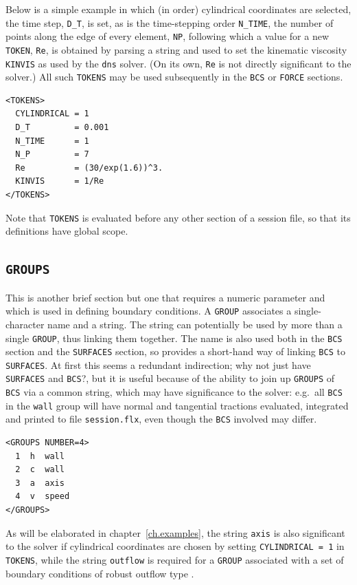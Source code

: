 \documentclass[11pt]{report}
\newcommand{\eg}{e.g.\ } \newcommand{\CC}{\mathrm{c.c.}}
\begin{document}
Below is a simple example in which (in order) cylindrical coordinates
are selected, the time step, \verb|D_T|, is set, as is the
time-stepping order \verb|N_TIME|, the number of points along the edge
of every element, \verb|NP|, following which a value for a new
\verb|TOKEN|, \verb|Re|, is obtained by parsing a string and used to
set the kinematic viscosity \verb|KINVIS| as used by the \verb|dns|
solver.  (On its own, \verb|Re| is not directly significant to the
solver.) All such \verb|TOKENS| may be used subsequently in the
\verb|BCS| or \verb|FORCE| sections.
%
{\small
\begin{verbatim}
<TOKENS>
  CYLINDRICAL = 1
  D_T         = 0.001
  N_TIME      = 1
  N_P         = 7
  Re          = (30/exp(1.6))^3.
  KINVIS      = 1/Re
</TOKENS>
\end{verbatim}
}
%
Note that \verb|TOKENS| is evaluated before any other section of a
session file, so that its definitions have global scope.

\subsection{\texttt{GROUPS}}
\label{sec.groups}

This is another brief section but one that requires a numeric
parameter and which is used in defining boundary conditions. A
\verb|GROUP| associates a single-character name and a string.  The
string can potentially be used by more than a single \verb|GROUP|,
thus linking them together.  The name is also used both in the
\verb|BCS| section and the \verb|SURFACES| section, so provides a
short-hand way of linking \verb|BCS| to \verb|SURFACES|.  At first
this seems a redundant indirection; why not just have \verb|SURFACES|
and \verb|BCS|?, but it is useful because of the ability to join up
\verb|GROUPS| of \verb|BCS| via a common string, which may have
significance to the solver: \eg all \verb|BCS| in the \verb|wall|
group will have normal and tangential tractions evaluated, integrated
and printed to file \verb|session.flx|, even though the \verb|BCS|
involved may differ.
%
{\small
\begin{verbatim}
<GROUPS NUMBER=4>
  1  h  wall
  2  c  wall
  3  a  axis
  4  v  speed
</GROUPS>
\end{verbatim}
}
%
As will be elaborated in chapter~\ref{ch.examples}, the string
\verb|axis| is also significant to the solver if cylindrical
coordinates are chosen by setting \verb|CYLINDRICAL = 1| in
\verb|TOKENS|, while the string \verb|outflow| is required for a
\verb|GROUP| associated with a set of boundary conditions of robust
outflow type \citep{dkc14}.
\end{document}
